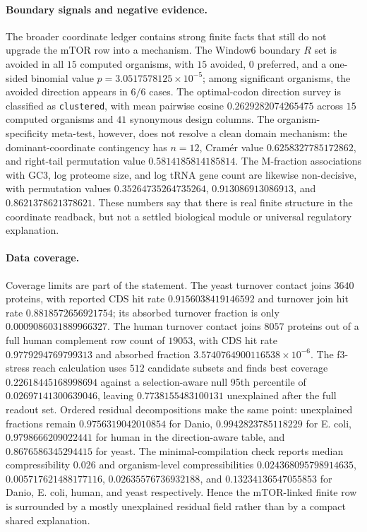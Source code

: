 \paragraph{Boundary signals and negative evidence.}
The broader coordinate ledger contains strong finite facts that still do not upgrade the mTOR row into a mechanism.  The Window6 boundary $R$ set is avoided in all $15$ computed organisms, with $15$ avoided, $0$ preferred, and a one-sided binomial value $p=3.0517578125\times 10^{-5}$; among significant organisms, the avoided direction appears in $6/6$ cases.  The optimal-codon direction survey is classified as \texttt{clustered}, with mean pairwise cosine $0.2629282074265475$ across $15$ computed organisms and $41$ synonymous design columns.  The organism-specificity meta-test, however, does not resolve a clean domain mechanism: the dominant-coordinate contingency has $n=12$, Cram\'er value $0.6258327785172862$, and right-tail permutation value $0.5814185814185814$.  The M-fraction associations with GC3, log proteome size, and log tRNA gene count are likewise non-decisive, with permutation values $0.35264735264735264$, $0.913086913086913$, and $0.8621378621378621$.  These numbers say that there is real finite structure in the coordinate readback, but not a settled biological module or universal regulatory explanation.

\paragraph{Data coverage.}
Coverage limits are part of the statement.  The yeast turnover contact joins $3640$ proteins, with reported CDS hit rate $0.9156038419146592$ and turnover join hit rate $0.8818572656921754$; its absorbed turnover fraction is only $0.0009086031889966327$.  The human turnover contact joins $8057$ proteins out of a full human complement row count of $19053$, with CDS hit rate $0.9779294769799313$ and absorbed fraction $3.5740764900116538\times 10^{-6}$.  The f3-stress reach calculation uses $512$ candidate subsets and finds best coverage $0.22618445168998694$ against a selection-aware null 95th percentile of $0.02697141300639046$, leaving $0.7738155483100131$ unexplained after the full readout set.  Ordered residual decompositions make the same point: unexplained fractions remain $0.9756319042010854$ for Danio, $0.9942823785118229$ for E. coli, $0.9798666209022441$ for human in the direction-aware table, and $0.8676586345294415$ for yeast.  The minimal-compilation check reports median compressibility $0.026$ and organism-level compressibilities $0.024368095798914635$, $0.005717621488177116$, $0.02635576736932188$, and $0.13234136547055853$ for Danio, E. coli, human, and yeast respectively.  Hence the mTOR-linked finite row is surrounded by a mostly unexplained residual field rather than by a compact shared explanation.

